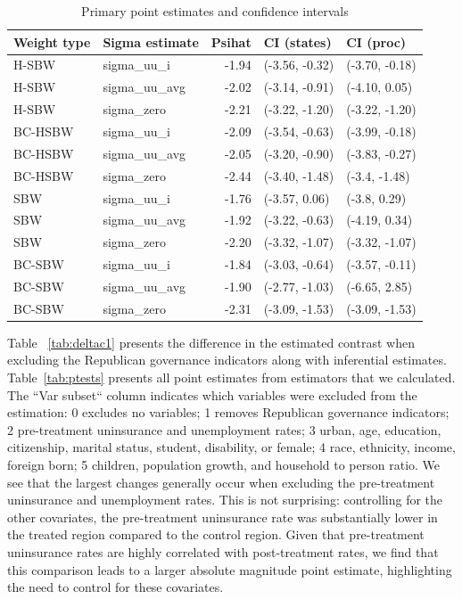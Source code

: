 \documentclass[aoas]{imsart}
\theoremstyle{plain}
\theoremstyle{remark}
\begin{document}
\begin{appendix}
\begin{table}[ht]
\centering
\caption{Primary point estimates and confidence intervals}
\label{tab:confintmain}
\begin{tabular}{llrll}
  \hline
Weight type & Sigma estimate & Psihat & CI (states) & CI (proc) \\ 
  \hline
H-SBW & sigma\_uu\_i & -1.94 & (-3.56, -0.32) & (-3.70, -0.18) \\ 
  H-SBW & sigma\_uu\_avg & -2.02 & (-3.14, -0.91) & (-4.10, 0.05) \\ 
  H-SBW & sigma\_zero & -2.21 & (-3.22, -1.20) & (-3.22, -1.20) \\ 
  BC-HSBW & sigma\_uu\_i & -2.09 & (-3.54, -0.63) & (-3.99, -0.18) \\ 
  BC-HSBW & sigma\_uu\_avg & -2.05 & (-3.20, -0.90) & (-3.83, -0.27) \\ 
  BC-HSBW & sigma\_zero & -2.44 & (-3.40, -1.48) & (-3.4, -1.48) \\ 
  SBW & sigma\_uu\_i & -1.76 & (-3.57, 0.06) & (-3.8, 0.29) \\ 
  SBW & sigma\_uu\_avg & -1.92 & (-3.22, -0.63) & (-4.19, 0.34) \\ 
  SBW & sigma\_zero & -2.20 & (-3.32, -1.07) & (-3.32, -1.07) \\ 
  BC-SBW & sigma\_uu\_i & -1.84 & (-3.03, -0.64) & (-3.57, -0.11) \\ 
  BC-SBW & sigma\_uu\_avg & -1.90 & (-2.77, -1.03) & (-6.65, 2.85) \\ 
  BC-SBW & sigma\_zero & -2.31 & (-3.09, -1.53) & (-3.09, -1.53) \\ 
   \hline
\end{tabular}
\end{table}

Table ~\ref{tab:deltac1} presents the difference in the estimated contrast when excluding the Republican governance indicators along with inferential estimates. Table~\ref{tab:ptests} presents all point estimates from estimators that we calculated. The ``Var subset`` column indicates which variables were excluded from the estimation: 0 excludes no variables; 1 removes Republican governance indicators; 2 pre-treatment uninsurance and unemployment rates; 3 urban, age, education, citizenship, marital status, student, disability, or female; 4 race, ethnicity, income, foreign born; 5 children, population growth, and household to person ratio. We see that the largest changes generally occur when excluding the pre-treatment uninsurance and unemployment rates. This is not surprising: controlling for the other covariates, the pre-treatment uninsurance rate was substantially lower in the treated region compared to the control region. Given that pre-treatment uninsurance rates are highly correlated with post-treatment rates, we find that this comparison leads to a larger absolute magnitude point estimate, highlighting the need to control for these covariates.


\end{appendix}
\end{document}
